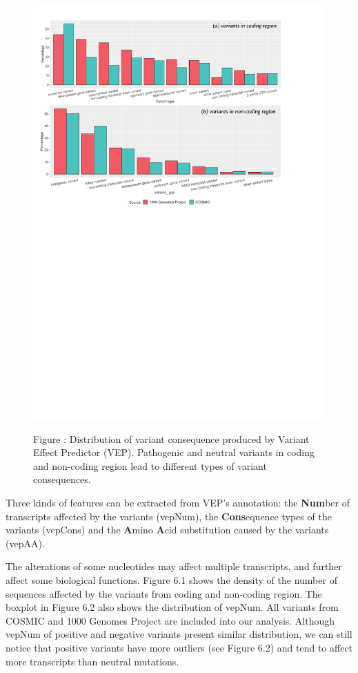 \documentclass[a4paper,nohyper,nobib,openany,justified]{tufte-book}
\begin{document}
\begin{fullwidth}
\begin{figure}[bp]
  \includegraphics[width=\linewidth]{summary_vep_cons.pdf}%

  \smallskip\noindent\small Figure \thefigure:
Distribution of variant consequence produced by Variant Effect Predictor (VEP). Pathogenic and neutral variants in coding and non-coding region lead to different types of variant consequences.
  \label{fig:vepCons}%
\end{figure}

Three kinds of features can be extracted from VEP's annotation: the \textbf{Num}ber of transcripts affected by the variants (vepNum), the \textbf{Cons}equence types of the variants (vepCons) and the \textbf{A}mino \textbf{A}cid substitution caused by the variants (vepAA).

The alterations of some nucleotides may affect multiple transcripts, and further affect some biological functions. Figure 6.1 shows the density of the number of sequences affected by the variants from coding and non-coding region. The boxplot in Figure 6.2 also shows the distribution of vepNum. All variants from COSMIC and 1000 Genomes Project are included into our analysis. Although vepNum of positive and negative variants present similar distribution, we can still notice that positive variants have more outliers (see Figure 6.2) and tend to affect more transcripts than neutral mutations.


\end{fullwidth}
\end{document}
